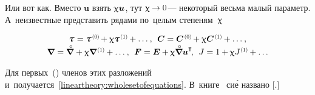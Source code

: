 \begin{otherlanguage}{russian}

Или вот как.
Вместо $\bm{u}$ взять $\upchi \bm{u}$, тут ${\upchi \hspace{-0.1ex}\to 0}$\:--- некоторый весьма малый параметр.
А~неизвестные представить рядами по~целым степеням~$\upchi$

\nopagebreak\vspace{-0.1em}\begin{equation*}
\begin{array}{c}
\cauchystress \hspace{.1ex} = \cauchystress^{\hspace{.2ex}\scalebox{0.66}{(0)}} \hspace{-0.2ex} + \smallparameter \cauchystress^{\hspace{.2ex}\scalebox{0.66}{(1)}} \hspace{-0.1ex} + \ldots \hspace{.1ex},
\:\:
\bm{C} = \bm{C}^{\hspace{.2ex}\scalebox{0.66}{(0)}} \hspace{-0.2ex} + \smallparameter \bm{C}^{\hspace{.2ex}\scalebox{0.66}{(1)}} \hspace{-0.1ex} + \ldots \hspace{.1ex} ,
\\[.1em]
%
\boldnabla \hspace{.1ex} = \boldnablacircled \hspace{.1ex} + \smallparameter \boldnabla^{\hspace{.2ex}\scalebox{0.66}{(1)}} \hspace{-0.1ex} + \ldots \hspace{.1ex} , \:\:
\bm{F} = \UnitDyad + \hspace{-0.1ex} \smallparameter \boldnablacircled {\bm{u}}^{\T} \hspace{-0.3ex},
\:\:
J = 1 + \hspace{-0.1ex} \smallparameter J^{\hspace{.1ex}\scalebox{0.66}{(1)}} \hspace{-0.1ex} + \ldots
\end{array}
\end{equation*}

\vspace{-0.1em}\noindent
Для первых~() членов этих разложений и~получается~\eqref{lineartheory:wholesetofequations}.
В~\hbox{книге~\cite{truesdell-firstcourse}} си\'{е} названо [.]


\end{otherlanguage}
